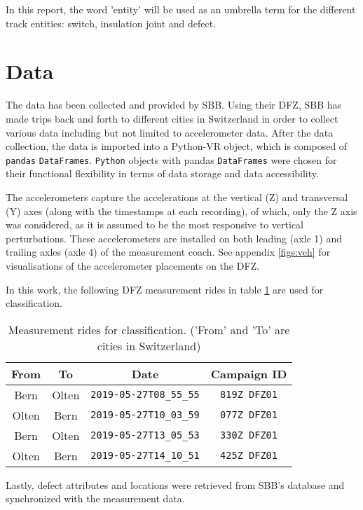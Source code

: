 In this report, the word 'entity' will be used as an umbrella term for the different track entities: switch, insulation joint and defect.

\section{Data}
The data has been collected and provided by SBB. Using their DFZ, SBB has made trips back and forth to different cities in Switzerland in order to collect various data including but not limited to accelerometer data. After the data collection, the data is imported into a Python-VR object, which is composed of \verb|pandas| \verb|DataFrames|. \verb|Python| objects with pandas \verb|DataFrames| were chosen for their functional flexibility in terms of data storage and data accessibility.

The accelerometers capture the accelerations at the vertical (Z) and transversal (Y) axes (along with the timestamps at each recording), of which, only the Z axis was considered, as it is assumed to be the most responsive to vertical perturbations. These accelerometers are installed on both leading (axle 1) and trailing axles (axle 4) of the measurement coach. See appendix \ref{figs:veh} for visualisations of the accelerometer placements on the DFZ. 

In this work, the following DFZ measurement rides in table \ref{tab:rides} are used for classification.

\begin{table}[H]
	\centering
	\begin{tabular}{|c|c|c|c|} \hline
		\textbf{From} & \textbf{To} & \textbf{Date} & \textbf{Campaign ID}\\ \hline \hline 
		Bern & Olten &  \verb|2019-05-27T08_55_55| & \verb|819Z DFZ01| \\ \hline 
		Olten & Bern &  \verb|2019-05-27T10_03_59| & \verb|077Z DFZ01| \\ \hline 
		Bern & Olten &  \verb|2019-05-27T13_05_53| & \verb|330Z DFZ01| \\ \hline 
		Olten & Bern &  \verb|2019-05-27T14_10_51| & \verb|425Z DFZ01| \\ \hline 
	\end{tabular}
	\caption{Measurement rides for classification. ('From' and 'To' are cities in Switzerland)}
	\label{tab:rides}
\end{table}

Lastly, defect attributes and locations were retrieved from SBB's database and synchronized with the measurement data.


